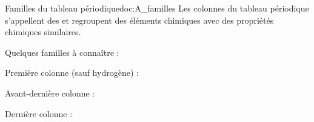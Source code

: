 \begin{doc}{Familles du tableau périodique}{doc:A_familles}
  Les colonnes du tableau périodique s'appellent des  et regroupent des éléments chimiques avec des propriétés chimiques similaires.
  \begin{importants}
    Quelques familles à connaître : 
    \begin{listePoints}
      \item Première colonne (sauf hydrogène) : 
      \item Avant-dernière colonne : 
      \item Dernière colonne : 
    \end{listePoints}
  \end{importants}
\end{doc}

